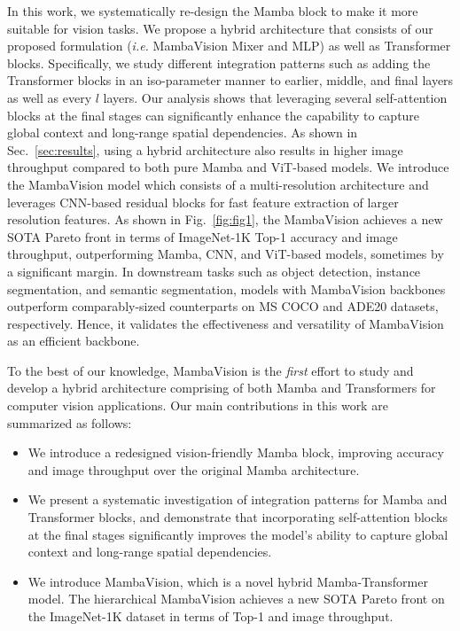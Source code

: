 \documentclass[10pt,twocolumn,letterpaper]{article}
\begin{document}
In this work, we systematically re-design the Mamba block to make it more suitable for vision tasks. We propose a hybrid architecture that consists of our proposed formulation (\textit{i.e.} MambaVision Mixer and MLP) as well as Transformer blocks. Specifically, we study different integration patterns such as adding the Transformer blocks in an iso-parameter manner to earlier, middle, and final layers as well as every $l$ layers. Our analysis shows that leveraging several self-attention blocks at the final stages can significantly enhance the capability to capture global context and long-range spatial dependencies. As shown in Sec.~\ref{sec:results}, using a hybrid architecture also results in higher image throughput compared to both pure Mamba and ViT-based models. We introduce the MambaVision model which consists of a multi-resolution architecture and leverages CNN-based residual blocks for fast feature extraction of larger resolution features. As shown in Fig.~\ref{fig:fig1}, the MambaVision achieves a new SOTA Pareto front in terms of ImageNet-1K Top-1 accuracy and image throughput, outperforming Mamba, CNN, and ViT-based models, sometimes by a significant margin. In downstream tasks such as object detection, instance segmentation, and semantic segmentation, models with MambaVision backbones outperform comparably-sized counterparts on MS COCO and ADE20 datasets, respectively. Hence, it validates the effectiveness and versatility of MambaVision as an efficient backbone.


To the best of our knowledge, MambaVision is the \emph{first} effort to study and develop a hybrid architecture comprising of both Mamba and Transformers for computer vision applications. Our main contributions in this work are summarized as follows:

\begin{itemize}[noitemsep,nosep]
\item We introduce a redesigned vision-friendly Mamba block, improving accuracy and image throughput over the original Mamba architecture.

\item We present a systematic investigation of integration patterns for Mamba and Transformer blocks, and demonstrate that incorporating self-attention blocks at the final stages significantly improves the model's ability to capture global context and long-range spatial dependencies.

\item We introduce MambaVision, which is a novel hybrid Mamba-Transformer model. The hierarchical MambaVision achieves a new SOTA Pareto front on the ImageNet-1K dataset in terms of Top-1 and image throughput.

\end{itemize}
\end{document}
